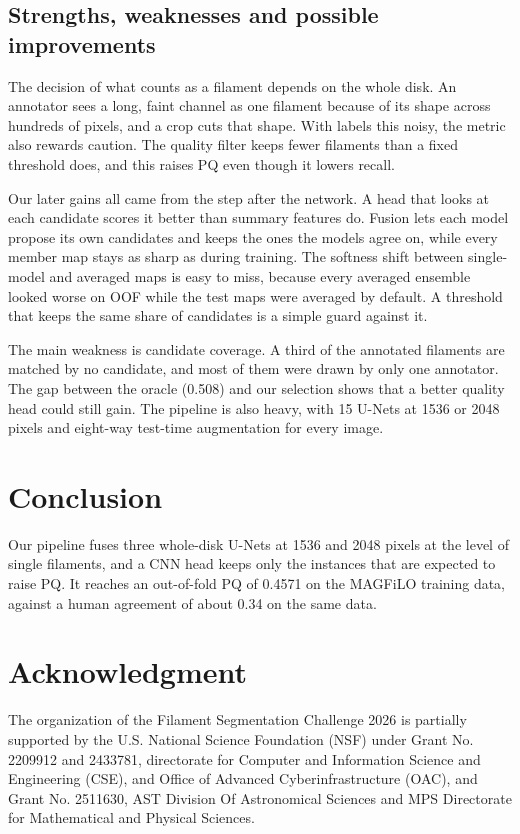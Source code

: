 \documentclass[sigconf]{acmart}
\begin{document}
\subsection{Strengths, weaknesses and possible improvements}

The decision of what counts as a filament depends on the whole disk. An annotator sees a long, faint channel as one filament because of its shape across hundreds of pixels, and a crop cuts that shape. With labels this noisy, the metric also rewards caution. The quality filter keeps fewer filaments than a fixed threshold does, and this raises PQ even though it lowers recall.

Our later gains all came from the step after the network. A head that looks at each candidate scores it better than summary features do. Fusion lets each model propose its own candidates and keeps the ones the models agree on, while every member map stays as sharp as during training. The softness shift between single-model and averaged maps is easy to miss, because every averaged ensemble looked worse on OOF while the test maps were averaged by default. A threshold that keeps the same share of candidates is a simple guard against it.

The main weakness is candidate coverage. A third of the annotated filaments are matched by no candidate, and most of them were drawn by only one annotator. The gap between the oracle (0.508) and our selection shows that a better quality head could still gain. The pipeline is also heavy, with 15 U-Nets at 1536 or 2048 pixels and eight-way test-time augmentation for every image.

\section{Conclusion}

Our pipeline fuses three whole-disk U-Nets at 1536 and 2048 pixels at the level of single filaments, and a CNN head keeps only the instances that are expected to raise PQ. It reaches an out-of-fold PQ of 0.4571 on the MAGFiLO training data, against a human agreement of about 0.34 on the same data.


\section{Acknowledgment}\label{sec:acknowledgment}
    The organization of the Filament Segmentation Challenge 2026 is partially supported by the U.S. National Science Foundation (NSF) under Grant No. 2209912 and 2433781, directorate for Computer and Information Science and Engineering (CSE), and Office of Advanced Cyberinfrastructure (OAC), and Grant No. 2511630, AST Division Of Astronomical Sciences and MPS Directorate for Mathematical and Physical Sciences.
\end{document}
